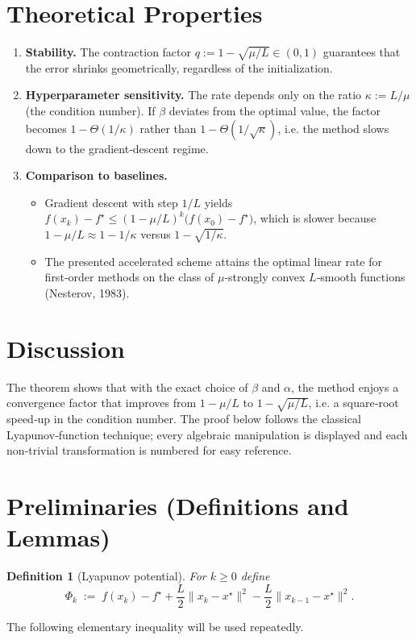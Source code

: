 \documentclass{article}
\newtheorem{definition}{Definition}
\begin{document}
\section*{Theoretical Properties}
\begin{enumerate}[label=\textbf{P\arabic*:}, leftmargin=*]
\item \textbf{Stability.} The contraction factor $q:=1-\sqrt{\mu/L}\in(0,1)$ guarantees that the error shrinks geometrically, regardless of the initialization.
\item \textbf{Hyperparameter sensitivity.} The rate depends only on the ratio $\kappa:=L/\mu$ (the condition number). If $\beta$ deviates from the optimal value, the factor becomes $1-\Theta(1/\kappa)$ rather than $1-\Theta(1/\sqrt{\kappa})$, i.e. the method slows down to the gradient‑descent regime.
\item \textbf{Comparison to baselines.}
\begin{itemize}
\item Gradient descent with step $1/L$ yields $f(x_k)-f^\star\le (1-\mu/L)^k\bigl(f(x_0)-f^\star\bigr)$, which is slower because $1-\mu/L\approx 1-1/\kappa$ versus $1-\sqrt{1/\kappa}$.
\item The presented accelerated scheme attains the optimal linear rate for first‑order methods on the class of $\mu$‑strongly convex $L$‑smooth functions (Nesterov, 1983).
\end{itemize}
\end{enumerate}

\section*{Discussion}
The theorem shows that with the exact choice of $\beta$ and $\alpha$, the method enjoys a convergence factor that improves from $1-\mu/L$ to $1-\sqrt{\mu/L}$, i.e. a square‑root speed‑up in the condition number. The proof below follows the classical Lyapunov‑function technique; every algebraic manipulation is displayed and each non‑trivial transformation is numbered for easy reference.

\newpage
\section*{Preliminaries (Definitions and Lemmas)}
\begin{definition}[Lyapunov potential]
For $k\ge 0$ define
\[
\Phi_k \;:=\; f(x_k)-f^\star + \frac{L}{2}\|x_k-x^\star\|^2 - \frac{L}{2}\|x_{k-1}-x^\star\|^2 .
\]
\end{definition}
The following elementary inequality will be used repeatedly.
\end{document}
